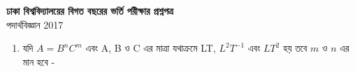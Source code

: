 \documentclass{article}
\begin{document}
\begin{center}
\begin{large}
\textbf{ঢাকা বিশ্ববিদ্যালয়ের বিগত বছরের ভর্তি পরীক্ষার প্রশ্নপত্র}\\
পদার্থবিজ্ঞান 2017
\end{large}
\end{center}
\begin{enumerate}
\item  যদি $A = B^{n}C^{m}$ এবং A, B ও C এর মাত্রা যথাক্রমে LT, $L^{2}T^{-1}$ এবং $LT^{2}$ হয় তবে $m$ ও $n$ এর মান হবে - 
\end{enumerate}
\end{document}
